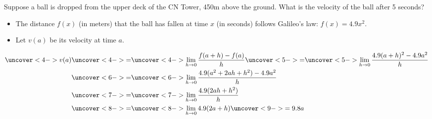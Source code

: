 \begin{frame}
\begin{example}[Example 3, p. 137]
Suppose a ball is dropped from the upper deck of the CN Tower, 450m above the ground.  What is the velocity of the ball after 5 seconds?
\begin{itemize}
\item<2->  The distance $f(x)$ (in meters) that the ball has fallen at time $x$ (in seconds) follows Galileo's law: $f(x) = 4.9x^2$.
\item<3->  Let $v(a)$ be its velocity at time $a$.
\end{itemize}
\abovedisplayskip=0pt
\belowdisplayskip=0pt
\begin{align*}
\uncover<4->{%
v(a)
}%
& \uncover<4->{ = } %
\uncover<4->{%
\lim_{h\rightarrow 0}\frac{f(a+h)-f(a)}{h}
}  \uncover<5->{ = } \uncover<5->{%
\lim_{h\rightarrow 0}\frac{4.9(a+h)^2-4.9a^2}{h}
}\\%
& \uncover<6->{ = } %
\uncover<6->{%
\lim_{h\rightarrow 0}\frac{4.9(a^2+2ah+h^2)-4.9a^2}{h}
}\\%
& \uncover<7->{ = } %
\uncover<7->{%
\lim_{h\rightarrow 0}\frac{4.9(2ah+h^2)}{h}
}\\%
& \uncover<8->{ = } %
\uncover<8->{%
\lim_{h\rightarrow 0}4.9(2a+h)
}%
\uncover<9->{%
 = 9.8a
}%
\end{align*}
%
\end{example}
\end{frame}
